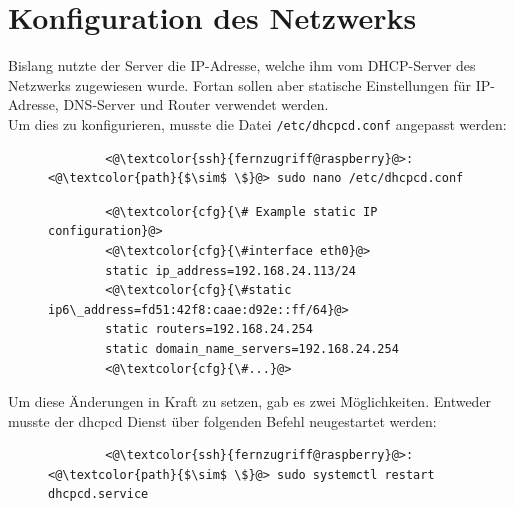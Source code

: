 \documentclass[a4paper, 11pt]{scrartcl}
\begin{document}
\section{Konfiguration des Netzwerks}\label{ch:network}
Bislang nutzte der Server die IP-Adresse, welche ihm vom DHCP-Server des Netzwerks zugewiesen wurde. Fortan sollen aber statische Einstellungen für IP-Adresse, DNS-Server und Router
verwendet werden.
\\
Um dies zu konfigurieren, musste die Datei \lstinline[basicstyle={\small\ttfamily\color{black}}]|/etc/dhcpcd.conf| angepasst
werden:
\begin{figure}[H]
    \begin{mdframed}[backgroundcolor=bbg]
        \begin{lstlisting}
        <@\textcolor{ssh}{fernzugriff@raspberry}@>:<@\textcolor{path}{$\sim$ \$}@> sudo nano /etc/dhcpcd.conf
        \end{lstlisting}
    \end{mdframed}
    \label{lst:nano_dhcpcd}
\end{figure}
\begin{figure}[H]
    \begin{mdframed}[backgroundcolor=bbg]
        \begin{lstlisting}
        <@\textcolor{cfg}{\# Example static IP configuration}@>
        <@\textcolor{cfg}{\#interface eth0}@>
        static ip_address=192.168.24.113/24
        <@\textcolor{cfg}{\#static ip6\_address=fd51:42f8:caae:d92e::ff/64}@>
        static routers=192.168.24.254
        static domain_name_servers=192.168.24.254
        <@\textcolor{cfg}{\#...}@>
        \end{lstlisting}
    \end{mdframed}
    \label{lst:static_ip}
\end{figure}
Um diese Änderungen in Kraft zu setzen, gab es zwei Möglichkeiten. Entweder musste der dhcpcd Dienst über folgenden Befehl neugestartet werden:
\begin{figure}[H]
    \begin{mdframed}[backgroundcolor=bbg]
        \begin{lstlisting}
        <@\textcolor{ssh}{fernzugriff@raspberry}@>:<@\textcolor{path}{$\sim$ \$}@> sudo systemctl restart dhcpcd.service
        \end{lstlisting}
    \end{mdframed}
    \label{lst:restart_dhcpcd}
\end{figure}
\end{document}
